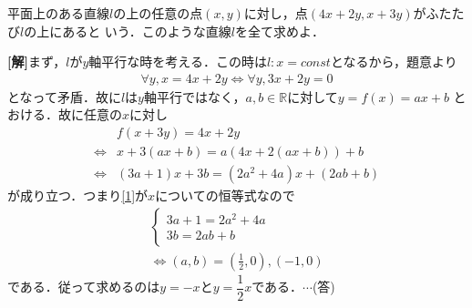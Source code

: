 \documentclass[a4j]{jarticle}
\begin{document}

     \begin{oframed}
     平面上のある直線$l$の上の任意の点$(x,y)$に対し，点$(4x+2y,x+3y)$がふたたび$l$の上にあると
     いう．このような直線$l$を全て求めよ．
     \end{oframed}

\setlength{\columnseprule}{0.4pt}
\begin{multicols}{2}
{\bf[解]}まず，$l$が$y$軸平行な時を考える．この時は$l:x=const$となるから，題意より
     \begin{align*}
     \forall y,x=4x+2y\Longleftrightarrow \forall y,3x+2y=0
     \end{align*}
となって矛盾．故に$l$は$y$軸平行ではなく，$a,b\in\mathbb{R}$に対して$y=f(x)=ax+b$
とおける．故に任意の$x$に対し
     \begin{align}
     &f(x+3y)=4x+2y \nonumber\\
     \Longleftrightarrow &x+3(ax+b)=a(4x+2(ax+b))+b \nonumber\\
      \Longleftrightarrow &(3a+1)x+3b=(2a^2+4a)x+(2ab+b) \label{1}
     \end{align}
が成り立つ．つまり\eqref{1}が$x$についての恒等式なので
     \begin{align*}
     \left\{
           \begin{array}{l}
           3a+1=2a^2+4a \\
           3b=2ab+b
           \end{array}
      \right.     \\
      \Longleftrightarrow
      (a,b)=\left(\frac{1}{2},0\right),(-1,0)
      \end{align*}
である．従って求めるのは$y=-x$と$y=\dfrac{1}{2}x$である．$\cdots$(答)     
\newpage
\end{multicols}
\end{document}

